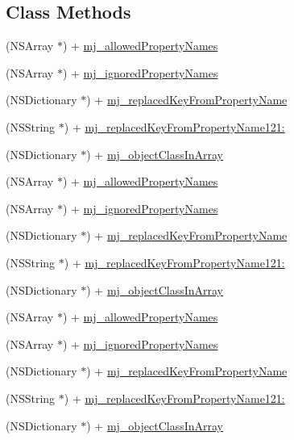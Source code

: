 \subsection*{Class Methods}
\begin{DoxyCompactItemize}
\item 
(N\+S\+Array $\ast$) + \mbox{\hyperlink{protocol_m_j_key_value_01-p_a0603bf4d03d6e05ce4d909269f14599f}{mj\+\_\+allowed\+Property\+Names}}
\item 
(N\+S\+Array $\ast$) + \mbox{\hyperlink{protocol_m_j_key_value_01-p_a0e48ddb376e945385a12def8b9552087}{mj\+\_\+ignored\+Property\+Names}}
\item 
(N\+S\+Dictionary $\ast$) + \mbox{\hyperlink{protocol_m_j_key_value_01-p_ae7846c344bbe8a1801cb6ddbcd120fa5}{mj\+\_\+replaced\+Key\+From\+Property\+Name}}
\item 
(N\+S\+String $\ast$) + \mbox{\hyperlink{protocol_m_j_key_value_01-p_a5dda775161dec6d3b18dd8c720f1f9c8}{mj\+\_\+replaced\+Key\+From\+Property\+Name121\+:}}
\item 
(N\+S\+Dictionary $\ast$) + \mbox{\hyperlink{protocol_m_j_key_value_01-p_a296b17988a1fd2d7ff15b0e73e612a4e}{mj\+\_\+object\+Class\+In\+Array}}
\item 
(N\+S\+Array $\ast$) + \mbox{\hyperlink{protocol_m_j_key_value_01-p_a0603bf4d03d6e05ce4d909269f14599f}{mj\+\_\+allowed\+Property\+Names}}
\item 
(N\+S\+Array $\ast$) + \mbox{\hyperlink{protocol_m_j_key_value_01-p_a0e48ddb376e945385a12def8b9552087}{mj\+\_\+ignored\+Property\+Names}}
\item 
(N\+S\+Dictionary $\ast$) + \mbox{\hyperlink{protocol_m_j_key_value_01-p_ae7846c344bbe8a1801cb6ddbcd120fa5}{mj\+\_\+replaced\+Key\+From\+Property\+Name}}
\item 
(N\+S\+String $\ast$) + \mbox{\hyperlink{protocol_m_j_key_value_01-p_a5dda775161dec6d3b18dd8c720f1f9c8}{mj\+\_\+replaced\+Key\+From\+Property\+Name121\+:}}
\item 
(N\+S\+Dictionary $\ast$) + \mbox{\hyperlink{protocol_m_j_key_value_01-p_a296b17988a1fd2d7ff15b0e73e612a4e}{mj\+\_\+object\+Class\+In\+Array}}
\item 
(N\+S\+Array $\ast$) + \mbox{\hyperlink{protocol_m_j_key_value_01-p_a0603bf4d03d6e05ce4d909269f14599f}{mj\+\_\+allowed\+Property\+Names}}
\item 
(N\+S\+Array $\ast$) + \mbox{\hyperlink{protocol_m_j_key_value_01-p_a0e48ddb376e945385a12def8b9552087}{mj\+\_\+ignored\+Property\+Names}}
\item 
(N\+S\+Dictionary $\ast$) + \mbox{\hyperlink{protocol_m_j_key_value_01-p_ae7846c344bbe8a1801cb6ddbcd120fa5}{mj\+\_\+replaced\+Key\+From\+Property\+Name}}
\item 
(N\+S\+String $\ast$) + \mbox{\hyperlink{protocol_m_j_key_value_01-p_a5dda775161dec6d3b18dd8c720f1f9c8}{mj\+\_\+replaced\+Key\+From\+Property\+Name121\+:}}
\item 
(N\+S\+Dictionary $\ast$) + \mbox{\hyperlink{protocol_m_j_key_value_01-p_a296b17988a1fd2d7ff15b0e73e612a4e}{mj\+\_\+object\+Class\+In\+Array}}
\end{DoxyCompactItemize}


